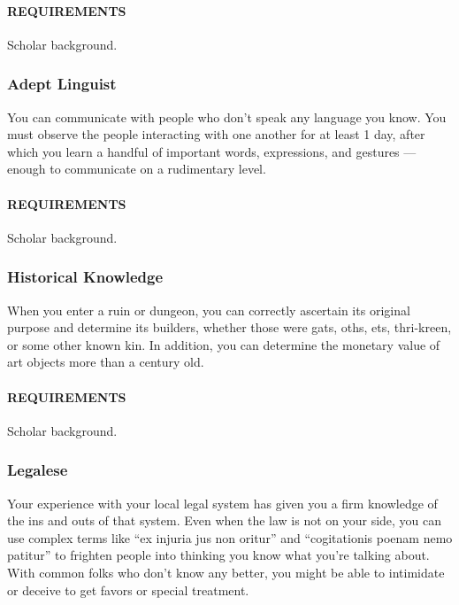     \paragraph{REQUIREMENTS} Scholar background.

    \subsubsection{Adept Linguist} \label{feat::adeptlinguist}
    You can communicate with people who don't speak any language you know.
    You must observe the people interacting with one another for at least 1 day, after which you learn a handful of important words, expressions, and gestures --- enough to communicate on a rudimentary level.
    \paragraph{REQUIREMENTS} Scholar background.

    \subsubsection{Historical Knowledge} \label{feat::historicalknowledge}
    When you enter a ruin or dungeon, you can correctly ascertain its original purpose and determine its builders, whether those were gats, oths, ets, thri-kreen, or some other known kin.
    In addition, you can determine the monetary value of art objects more than a century old.
    \paragraph{REQUIREMENTS} Scholar background.

    \subsubsection{Legalese} \label{feat::legalese}
    Your experience with your local legal system has given you a firm knowledge of the ins and outs of that system.
    Even when the law is not on your side, you can use complex terms like ``ex injuria jus non oritur'' and ``cogitationis poenam nemo patitur'' to frighten people into thinking you know what you're talking about.
    With common folks who don't know any better, you might be able to intimidate or deceive to get favors or special treatment.
